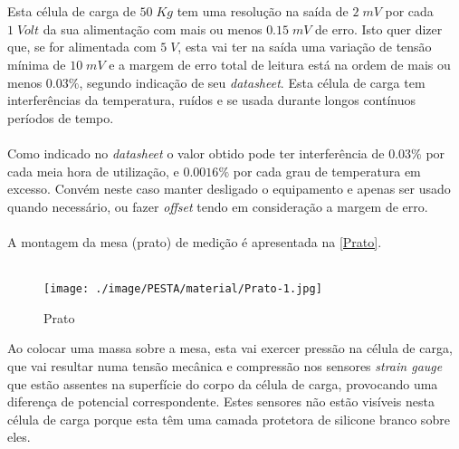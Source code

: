 \\
\\
Esta célula de carga de $50 \; Kg$ tem uma resolução na saída de $2 \; mV$ por cada $1 \; Volt$ da sua alimentação com mais ou menos $0.15 \; mV$ de erro. Isto quer dizer que, se for alimentada com $5 \; V$, esta vai ter na saída uma variação de tensão mínima de $10 \; mV$ e a margem de erro total de leitura está na ordem de mais ou menos $0.03\%$, segundo indicação de seu \textit{datasheet}.
Esta célula de carga tem interferências da temperatura, ruídos e se usada durante longos contínuos períodos de tempo.
\\
\\
Como indicado no \textit{datasheet} o valor obtido pode ter interferência de $0.03\%$ por cada meia hora de utilização, e $0.0016\%$ por cada grau de temperatura em excesso. Convém neste caso manter desligado o equipamento e apenas ser usado quando necessário, ou fazer \textit{offset} tendo em consideração a margem de erro.
\\
\\
A montagem da mesa (prato) de medição é apresentada na \autoref{Prato}.
\\
\\
\begin{minipage}[!b]{\linewidth}
\begin{figure}[H]
	\centering
	\texttt{[image: ./image/PESTA/material/Prato-1.jpg]}
	\caption{Prato}
	\label{Prato}
\end{figure}
\end{minipage}
Ao colocar uma massa sobre a mesa, esta vai exercer pressão na célula de carga, que vai resultar numa tensão mecânica e compressão nos sensores \textit{strain gauge} que estão assentes na superfície do corpo da célula de carga, provocando uma diferença de potencial correspondente. Estes sensores não estão visíveis nesta célula de carga porque esta têm uma camada protetora de silicone branco sobre eles.

